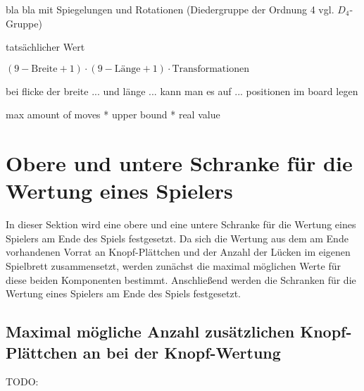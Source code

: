 bla bla mit Spiegelungen und Rotationen (Diedergruppe der Ordnung 4 vgl. $D_4$-Gruppe)


tatsächlicher Wert










$\left(9-\text{Breite}+1\right)\cdot\left(9-\text{Länge}+1\right)\cdot\text{Transformationen}$

bei flicke der breite ... und länge ... kann man es auf ... positionen im board legen

max amount of moves
* upper bound
* real value

\section{Obere und untere Schranke für die Wertung eines Spielers}

In dieser Sektion wird eine obere und eine untere Schranke für die Wertung eines Spielers am Ende des Spiels festgesetzt. Da sich die Wertung aus dem am Ende vorhandenen Vorrat an Knopf-Plättchen und der Anzahl der Lücken im eigenen Spielbrett zusammensetzt, werden zunächst die maximal möglichen Werte für diese beiden Komponenten bestimmt. Anschließend werden die Schranken für die Wertung eines Spielers am Ende des Spiels festgesetzt.

\subsection*{Maximal mögliche Anzahl zusätzlichen Knopf-Plättchen an bei der Knopf-Wertung}

TODO:

